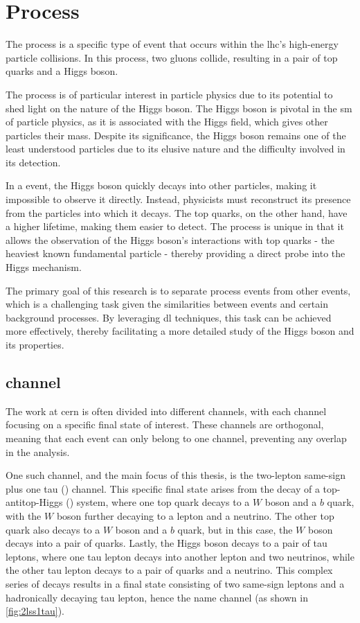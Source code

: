 \section{\tth Process}

The \tth process is a specific type of event that occurs within the \gls{lhc}'s high-energy
particle collisions. In this process, two gluons collide, resulting in a pair of top quarks and a Higgs boson.

The \tth process is of particular interest in particle physics due to its potential to shed light on the nature of the
Higgs boson. The Higgs boson is pivotal in the \gls{sm} of particle physics, as it is associated with the Higgs
field, which gives other particles their mass. Despite its significance, the Higgs boson remains one of the least
understood particles due to its elusive nature and the difficulty involved in its detection.

In a \tth event, the Higgs boson quickly decays into other particles, making it impossible to observe it directly. Instead,
physicists must reconstruct its presence from the particles into which it decays. The top quarks, on the other hand,
have a higher lifetime, making them easier to detect. The \tth process is unique in that it allows the observation of the
Higgs boson's interactions with top quarks - the heaviest known fundamental particle - thereby providing a direct probe
into the Higgs mechanism.

The primary goal of this research is to separate \tth process events from other events, which is a challenging task given
the similarities between \tth events and certain background processes. By leveraging \gls{dl} techniques, this task can
be achieved more effectively, thereby facilitating a more detailed study of the Higgs boson and its properties.

\subsection{\lss channel}
\label{sec:lss}



The work at \gls{cern} is often divided into different channels, with each channel focusing on a specific final state of
interest. These channels are orthogonal, meaning that each event can only belong to one channel, preventing any overlap
in the analysis.

One such channel, and the main focus of this thesis, is the two-lepton same-sign plus one tau (\lss) channel. This
specific final state arises from the decay of a top-antitop-Higgs (\tth) system, where one top quark decays to a $W$ boson
and a $b$ quark, with the $W$ boson further decaying to a lepton and a neutrino. The other top quark also decays to a $W$
boson and a $b$ quark, but in this case, the $W$ boson decays into a pair of quarks. Lastly, the Higgs boson decays to a
pair of tau leptons, where one tau lepton decays into another lepton and two neutrinos, while the other tau lepton
decays to a pair of quarks and a neutrino. This complex series of decays results in a final state consisting of two
same-sign leptons and a hadronically decaying tau lepton, hence the name \lss channel (as shown in \autoref{fig:2lss1tau}).

